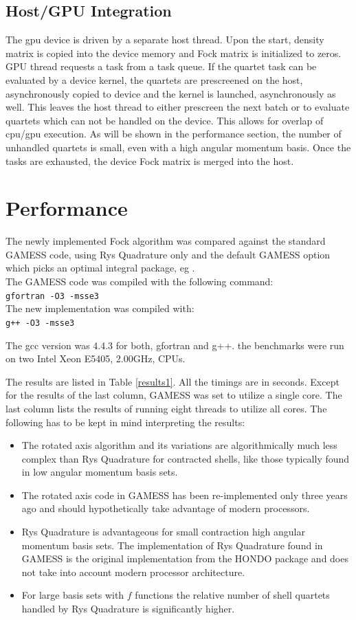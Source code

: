 \documentclass[12pt]{article}
\begin{document}
\subsection*{Host/GPU Integration}
The gpu device is driven by a separate host thread.  Upon the start,
density matrix is copied into the device memory and Fock matrix is
initialized to zeros.  GPU thread requests a task from a task queue.
If the quartet task can be evaluated by a device kernel, the quartets
are prescreened on the host, asynchronously copied to device and the
kernel is launched, asynchronously as well.  This leaves the host
thread to either prescreen the next batch or to evaluate quartets
which can not be handled on the device.  This allows for overlap of
cpu/gpu execution.  As will be shown in the performance section, the
number of unhandled quartets is small, even with a high angular
momentum basis.  Once the tasks are exhausted, the device Fock matrix
is merged into the host.


\section*{Performance}
The newly implemented Fock algorithm was compared against the
standard GAMESS \cite{gamess} code, using Rys Quadrature only
and the default GAMESS option which picks an optimal integral package,
eg \cite{ishimura}. \\
The GAMESS code was compiled with the following command:\\
{\tt gfortran -O3 -msse3}\\
The new implementation was compiled with:\\
{\tt g++ -O3 -msse3}

The gcc version was 4.4.3 for both, gfortran and g++.
the benchmarks were run on two Intel Xeon E5405, 2.00GHz, CPUs.

The results are listed in Table \ref{results1}. All the timings are in seconds.
Except for the results of the last column, GAMESS was set to utilize a single
core. The last column lists the results of running eight threads
to utilize all cores.
The following has to be kept in mind interpreting the results:

\begin{itemize}
  \item The rotated axis algorithm and its variations are
    algorithmically much less complex than Rys Quadrature for
    contracted shells, like those typically found in low angular
    momentum basis sets.
\item The rotated axis code \cite{ishimura} in GAMESS has been
  re-implemented only three years ago and should hypothetically take
  advantage of modern processors.
\item Rys Quadrature is advantageous for small contraction high
  angular momentum basis sets.  The implementation of Rys Quadrature
  found in GAMESS is the original implementation from the HONDO
  \cite{hondo} package and does not take into account modern processor
  architecture.
\item For large basis sets with $f$ functions the relative number of
  shell quartets handled by Rys Quadrature is significantly higher.
\end{itemize}
\end{document}
